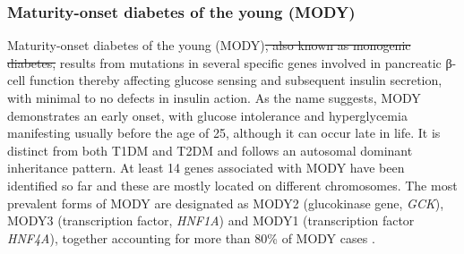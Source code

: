 \subsubsection{Maturity-onset diabetes of the young (MODY)}
Maturity-onset diabetes of the young (MODY)\st{, also known as monogenic diabetes,} results from mutations in several specific genes involved in pancreatic β-cell function thereby affecting glucose sensing and subsequent insulin secretion, with minimal to no defects in insulin action. As the name suggests, MODY demonstrates an early onset, with glucose intolerance and hyperglycemia manifesting usually before the age of 25, although it can occur late in life. It is distinct from both T1DM and T2DM and follows an autosomal dominant inheritance pattern. At least 14 genes associated with MODY have been identified so far and these are mostly located on different chromosomes. The most prevalent forms of MODY are designated as MODY2 (glucokinase gene, \textit{GCK}), MODY3 (transcription factor, \textit{HNF1A}) and MODY1 (transcription factor \textit{HNF4A}), together accounting for more than 80\% of MODY cases \textbf{\cite{banday_pathophysiology_2020,american_diabetes_association_2_2020}}.

